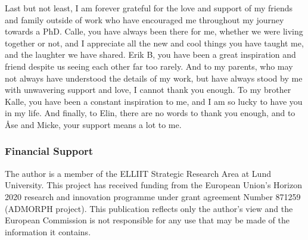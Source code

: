 Last but not least, I am forever grateful for the love and support of my friends and family outside of work who have encouraged me throughout my journey towards a PhD.
Calle, you have always been there for me, whether we were living together or not, and I appreciate all the new and cool things you have taught me, and the laughter we have shared.
Erik B, you have been a great inspiration and friend despite us seeing each other far too rarely.
And to my parents, who may not always have understood the details of my work, but have always stood by me with unwavering support and love, I cannot thank you enough.
To my brother Kalle, you have been a constant inspiration to me, and I am so lucky to have you in my life.
And finally, to Elin, there are no words to thank you enough, and to {\AA}se and Micke, your support means a lot to me.

\subsubsection*{Financial Support}
The author is a member of the ELLIIT Strategic Research Area at Lund University.
This project has received funding from the European Union's Horizon 2020 research and innovation programme under grant agreement Number 871259 (ADMORPH project).
This publication reflects only the author's view and the European Commission is not responsible for any use that may be made of the information it contains.

